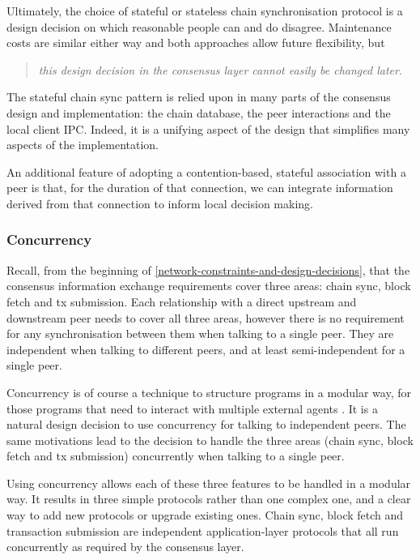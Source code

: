 \documentclass[11pt,a4paper]{article}
\begin{document}
Ultimately, the choice of stateful or stateless chain synchronisation
protocol is a design decision on which reasonable people can and do
disagree. Maintenance costs are similar either way and both approaches
allow future flexibility, but

\begin{quote}
\emph{this design decision in the consensus layer cannot easily
be changed later}.
\end{quote}

The stateful chain sync pattern is relied upon in many parts of the
consensus design and implementation: the chain database, the peer
interactions and the local client IPC. Indeed, it is a unifying aspect
of the design that simplifies many aspects of the implementation.

An additional feature of adopting a contention-based, stateful
association with a peer is that, for the duration of that connection, we
can integrate information derived from that connection to inform local
decision making.

\subsubsection{Concurrency}
\label{concurrency}

Recall, from the beginning of
\cref{network-constraints-and-design-decisions}, that the consensus information exchange requirements cover three
areas: chain sync, block fetch and tx submission. Each relationship with
a direct upstream and downstream peer needs to cover all three areas,
however there is no requirement for any synchronisation between them
when talking to a single peer. They are independent when talking to
different peers, and at least semi-independent for a single peer.

Concurrency is of course a technique to structure programs in a modular
way, for those programs that need to interact with multiple external
agents \cite[Chapter 1]{Marlow13}. It is a natural design decision to use
concurrency for talking to independent peers. The same motivations lead
to the decision to handle the three areas (chain sync, block fetch and
tx submission) concurrently when talking to a single peer.

Using concurrency allows each of these three features to be handled in a
modular way. It results in three simple protocols rather than one
complex one, and a clear way to add new protocols or upgrade existing
ones. Chain sync, block fetch and transaction submission are independent
application-layer protocols that all run concurrently as required by the
consensus layer.
\end{document}
